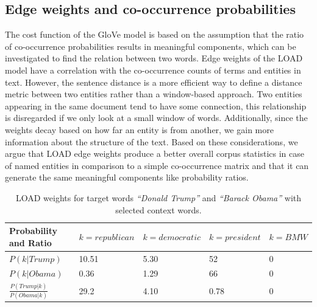 \subsection{Edge weights and co-occurrence probabilities}\label{subsec:weights_load}
The cost function of the GloVe model is based on the assumption that the ratio of co-occurrence probabilities results in meaningful components, which can be investigated to find the relation between two words. Edge weights of the LOAD model have a correlation with the co-occurrence counts of terms and entities in text. However, the sentence distance is a more efficient way to define a distance metric between two entities rather than a window-based approach. Two entities appearing in the same document tend to have some connection, this relationship is disregarded if we only look at a small window of words. Additionally, since the weights decay based on how far an entity is from another, we gain more information about the structure of the text. Based on these considerations, we argue that LOAD edge weights produce a better overall corpus statistics in case of named entities in comparison to a simple co-occurrence matrix and that it can generate the same meaningful components like probability ratios. \\
\begin{table}[]
\centering

\begin{tabular}{@{}l|l|l|l|l@{}}
\toprule
Probability and Ratio&  $k=republican$& $k=democratic$ & $k=president$ &$k= BMW$  \\ \midrule
 $P(k|Trump)$& {\color[HTML]{CB0000}10.51} &  {\color[HTML]{329A9D}5.30} & {\color[HTML]{CB0000}52} & {\color[HTML]{329A9D}0} \\\midrule
  $P(k|Obama)$&{\color[HTML]{329A9D}0.36}  & {\color[HTML]{CB0000}1.29} &  {\color[HTML]{CB0000}66}&{\color[HTML]{329A9D}0}  \\\midrule
 $\frac { P(Trump|k) }{ P(Obama|k) } $& {\color[HTML]{CB0000}29.2} &  {\color[HTML]{329A9D}4.10}&  0.78 &    0  \\\midrule
\end{tabular}%

\caption{LOAD weights for target words \emph{``Donald Trump''} and \emph{``Barack Obama''} with selected context words. }
\label{table:tab_2}
\end{table}
\label{sec:components_load}
